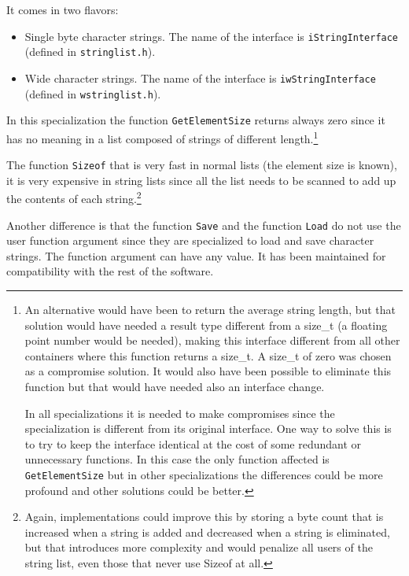 \documentclass[12pt,a4paper,openany]{memoir} %
\begin{document}
{It comes in two flavors:
\begin{itemize}
\item Single byte character strings. The name of the interface is \texttt{iStringInterface} (defined in \texttt{stringlist.h}).
\item Wide character strings. The name of the interface is \texttt{iwStringInterface} (defined in \texttt{wstringlist.h}).
\end{itemize}
In this specialization the function \texttt{GetElementSize} returns always zero since it has no meaning in a list composed of strings of different
length.\footnote{An alternative would have been to return the average string length, but that solution would have needed a result type different from a 
size\_t (a floating point number would be needed), making this interface different from all other containers where this function returns a
size\_t. A size\_t of zero was chosen as a compromise solution. It would also have been possible to eliminate this function but that would have needed 
also an interface change.\par In all specializations it is needed to make compromises since the specialization is different from its original 
interface. One 
way to solve this is to try to keep the interface identical at the cost of some redundant or unnecessary functions. In this case the only function 
affected is \texttt{GetElementSize} but in other specializations the differences could be more profound and other solutions could be better.}

The function \texttt{Sizeof} that is very fast in normal lists (the element size is known), it is very expensive in string lists since all
the list needs to be scanned to add up the contents of each string.\footnote{Again, implementations could improve this by storing a byte count that
is increased when a string is added and decreased when a string is eliminated, but that introduces more complexity and would penalize all users
of the string list, even those that never use Sizeof at all.}

Another difference is that the function \texttt{Save} and the function \texttt{Load} do not use the user function argument since they are specialized
to load and save character strings. The function argument can have any value. It has been maintained for compatibility with the rest of the software.


\newpage
}
\end{document}
